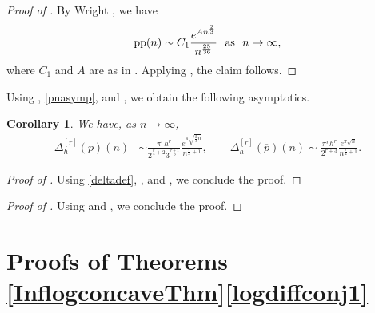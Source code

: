 \documentclass[11pt,reqno,a4paper]{amsart}
\renewcommand{\(}{\left\(}
\renewcommand{\)}{\right\)}
\numberwithin{equation}{section}
\theoremstyle{plain}
\newtheorem{corollary}[theorem]{Corollary}
\theoremstyle{definition} %
\numberwithin{equation}{section}
\begin{document}
\begin{proof}[Proof of ]
By Wright \cite{Wright}, we have 
\begin{equation*}%
\textup{pp}(n)\sim C_1\frac{e^{A n^{\frac 23}}}{n^{\frac{25}{36}}}\ \ \text{as}\ \ n\to \infty,
\end{equation*}
where $C_1$ and $A$ are as in . Applying , the claim follows.\qedhere 
\end{proof}
	
 

 Using , \eqref{pnasymp}, and \cite{HR}, we obtain the following asymptotics. 


\begin{corollary}\label{shiftediffthm}
	We have, as $n\to \infty$, 
\begin{align*}
	\Delta^{[r]}_{h}(p)(n)&\sim
\frac{\pi^r h^r}{2^{\frac r2+2}3^{\frac{r+1}2}}\frac{ e^{\pi\sqrt{\frac{2}{3}n}}}{n^{\frac r2+1}},\qquad 
\Delta^{[r]}_{h}(\overline{p})(n)\sim \frac{\pi^rh^r}{2^{r+3}} \frac{e^{\pi\sqrt{n}}}{n^{\frac r2+1}}.
\end{align*}
\end{corollary}




\begin{proof}[Proof of ]
 Using \eqref{deltadef}, , and , we conclude the proof.
\end{proof}




\begin{proof}[Proof of ]
Using  and , we conclude the proof.
\end{proof}




\section{Proofs of Theorems \ref{InflogconcaveThm}\textendash\ref{logdiffconj1}}\label{newsec2}
\end{document}
